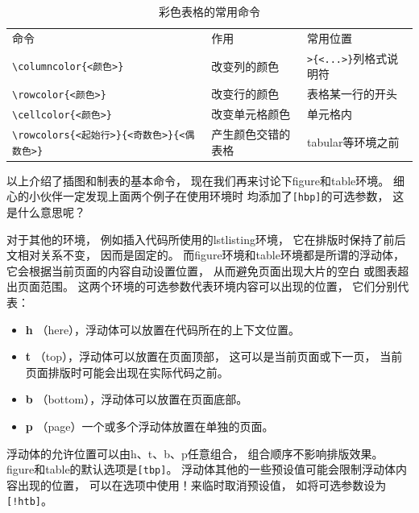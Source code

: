 \documentclass[UTF8]{ctexart}
\numberwithin{equation}{section}			%
\begin{document}
    \begin{table}[hbp]
        \centering
        \caption{彩色表格的常用命令}
        \label{tab:tabcolor}
        \begin{tabular}{lll}
            命令 & 作用 & 常用位置 \\
            \verb|\columncolor{<颜色>}| & 改变列的颜色
                & \verb|>{<...>}|列格式说明符 \\
            \verb|\rowcolor{<颜色>}| &  改变行的颜色
                & 表格某一行的开头 \\
            \verb|\cellcolor{<颜色>}| & 改变单元格颜色
                & 单元格内 \\
            \verb|\rowcolors{<起始行>}{<奇数色>}{<偶数色>}|
                & 产生颜色交错的表格 & tabular等环境之前 \\
        \end{tabular}
    \end{table}
    
    以上介绍了插图和制表的基本命令，
    现在我们再来讨论下figure和table环境。
    细心的小伙伴一定发现上面两个例子在使用环境时
    均添加了\verb|[hbp]|的可选参数，
    这是什么意思呢？
    
    对于其他的环境，
    例如插入代码所使用的lstlisting环境，
    它在排版时保持了前后文相对关系不变，
    因而是固定的。
    而figure环境和table环境都是所谓的浮动体，
    它会根据当前页面的内容自动设置位置，
    从而避免页面出现大片的空白
    或图表超出页面范围。
    这两个环境的可选参数代表环境内容可以出现的位置，
    它们分别代表：
    
    \begin{itemize}
        \item \textbf{h} （here），浮动体可以放置在代码所在的上下文位置。
        \item \textbf{t} （top），浮动体可以放置在页面顶部，
            这可以是当前页面或下一页，
            当前页面排版时可能会出现在实际代码之前。
        \item \textbf{b} （bottom），浮动体可以放置在页面底部。
        \item \textbf{p} （page）一个或多个浮动体放置在单独的页面。
    \end{itemize}

    浮动体的允许位置可以由h、t、b、p任意组合，
    组合顺序不影响排版效果。
    figure和table的默认选项是\verb|[tbp]|。
    浮动体其他的一些预设值可能会限制浮动体内容出现的位置，
    可以在选项中使用！来临时取消预设值，
    如将可选参数设为\verb|[!htb]|。
    
\end{document}
